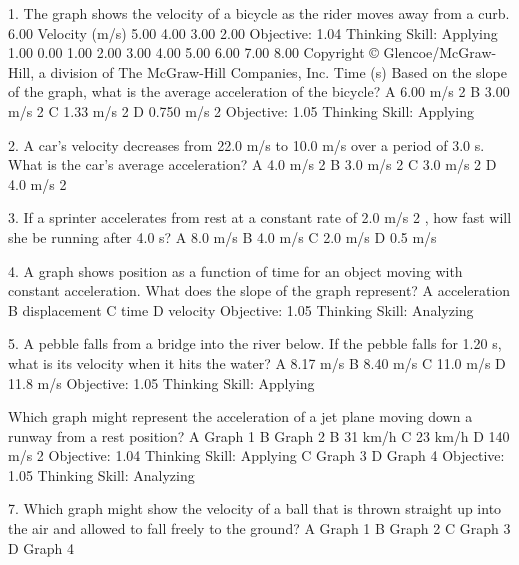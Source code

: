 





1. The graph shows the velocity of a bicycle as
the rider moves away from a curb.
6.00
Velocity (m/s)
5.00
4.00
3.00
2.00 Objective: 1.04
Thinking Skill: Applying
1.00
0.00
1.00 2.00 3.00 4.00 5.00 6.00 7.00 8.00
Copyright © Glencoe/McGraw-Hill, a division of The McGraw-Hill Companies, Inc.
Time (s)
Based on the slope of the graph, what is the
average acceleration of the bicycle?
A 6.00 m/s 2
B 3.00 m/s 2
C 1.33 m/s 2
D 0.750 m/s 2
Objective: 1.05
Thinking Skill: Applying

2. A car’s velocity decreases from 22.0 m/s to
10.0 m/s over a period of 3.0 s. What is the
car’s average acceleration?
A 4.0 m/s 2
B 3.0 m/s 2
C 3.0 m/s 2
D 4.0 m/s 2


3. If a sprinter accelerates from rest at a
constant rate of 2.0 m/s 2 , how fast will she
be running after 4.0 s?
A 8.0 m/s
B 4.0 m/s
C 2.0 m/s
D 0.5 m/s

4. A graph shows position as a function of
time for an object moving with constant
acceleration. What does the slope of the
graph represent?
A acceleration
B displacement
C time
D velocity
Objective: 1.05
Thinking Skill: Analyzing

5. A pebble falls from a bridge into the river
below. If the pebble falls for 1.20 s, what is
its velocity when it hits the water?
A 8.17 m/s
B 8.40 m/s
C 11.0 m/s
D 11.8 m/s
Objective: 1.05
Thinking Skill: Applying




Which graph might represent the
acceleration of a jet plane moving down a
runway from a rest position?
A Graph 1
B Graph 2
B 31 km/h
C 23 km/h
D 140 m/s 2
Objective: 1.04
Thinking Skill: Applying
C Graph 3
D Graph 4
Objective: 1.05
Thinking Skill: Analyzing

7. Which graph might show the velocity of a
ball that is thrown straight up into the air
and allowed to fall freely to the ground?
A Graph 1
B Graph 2
C Graph 3
D Graph 4










\endinput

